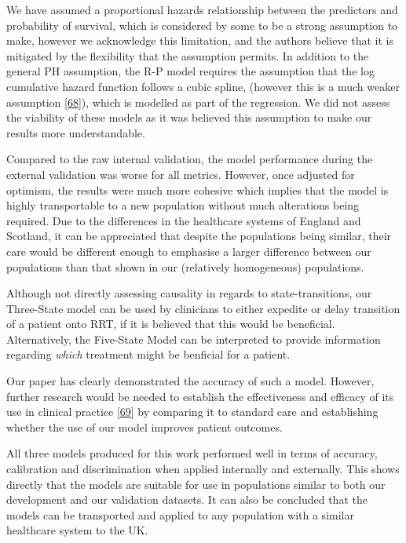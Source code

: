 \documentclass[
]{article}
\begin{document}
We have assumed a proportional hazards relationship between the predictors and probability of survival, which is considered by some to be a strong assumption to make, however we acknowledge this limitation, and the authors believe that it is mitigated by the flexibility that the assumption permits. In addition to the general PH assumption, the R-P model requires the assumption that the log cumulative hazard function follows a cubic spline, (however this is a much weaker assumption {[}\protect\hyperlink{ref-royston_flexible_2002}{68}{]}), which is modelled as part of the regression. We did not assess the viability of these models as it was believed this assumption to make our results more understandable.

Compared to the raw internal validation, the model performance during the external validation was worse for all metrics. However, once adjusted for optimism, the results were much more cohesive which implies that the model is highly transportable to a new population without much alterations being required. Due to the differences in the healthcare systems of England and Scotland, it can be appreciated that despite the populations being similar, their care would be different enough to emphasise a larger difference between our populations than that shown in our (relatively homogeneous) populations.

Although not directly assessing causality in regards to state-transitions, our Three-State model can be used by clinicians to either expedite or delay transition of a patient onto RRT, if it is believed that this would be beneficial. Alternatively, the Five-State Model can be interpreted to provide information regarding \emph{which} treatment might be benficial for a patient.

Our paper has clearly demonstrated the accuracy of such a model. However, further research would be needed to establish the effectiveness and efficacy of its use in clinical practice {[}\protect\hyperlink{ref-moons_prognosis_2009-1}{69}{]} by comparing it to standard care and establishing whether the use of our model improves patient outcomes.

All three models produced for this work performed well in terms of accuracy, calibration and discrimination when applied internally and externally. This shows directly that the models are suitable for use in populations similar to both our development and our validation datasets. It can also be concluded that the models can be transported and applied to any population with a similar healthcare system to the UK.
\end{document}
